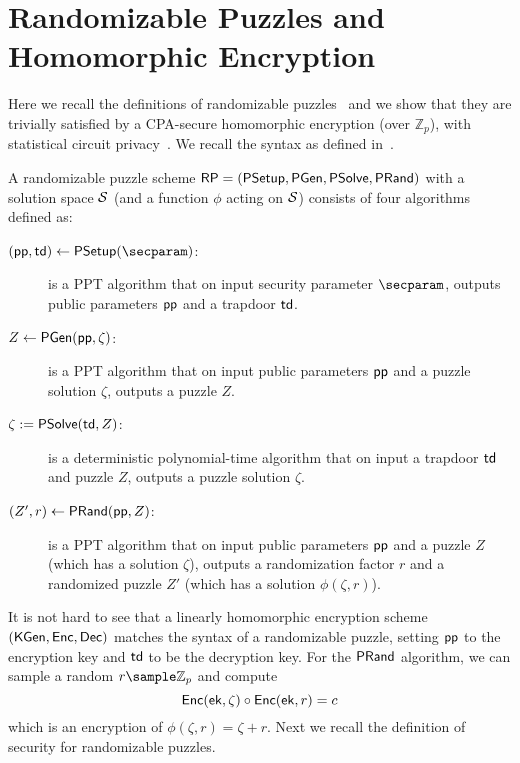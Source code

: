 \chapter{Randomizable Puzzles and Homomorphic Encryption}
\label{sec:randpuzzle}

Here we recall the definitions of randomizable puzzles~\cite{SP:TaiMorMaf21} and we show that they are trivially satisfied by a CPA-secure homomorphic encryption (over $\mathbb{Z}_p$), with statistical circuit privacy~\cite{C:OstPasPas14}. We recall the syntax as defined in~\cite{SP:TaiMorMaf21}.

\begin{definition}
A randomizable puzzle scheme $\mathsf{RP} = (\mathsf{PSetup}, \mathsf{PGen}, \mathsf{PSolve}, \mathsf{PRand})$ with a solution space $\mathcal{S}$ (and a function $\phi$ acting on $\mathcal{S}$) consists of four algorithms defined as:
\begin{description}
	\item[$(\pparam, \td) \gets \psetup(\secparam)$:] is a PPT algorithm that on input security parameter $\secparam$, outputs public parameters $\mathsf{pp}$ and a trapdoor $\mathsf{td}$.
	\item[$Z \gets \mathsf{PGen}(\mathsf{pp}, \zeta)$:] is a PPT algorithm that on input public parameters $\mathsf{pp}$ and a puzzle solution $\zeta$, outputs a puzzle $Z$.
	\item[$\zeta := \mathsf{PSolve}(\mathsf{td}, Z)$:] is a deterministic polynomial-time algorithm that on input a trapdoor $\mathsf{td}$ and puzzle $Z$, outputs a puzzle solution $\zeta$.
	\item[$(Z', r) \gets \mathsf{PRand}(\mathsf{pp}, Z)$:] is a PPT algorithm that on input public parameters $\mathsf{pp}$ and a puzzle $Z$ (which has a solution $\zeta$), outputs a randomization factor $r$ and a randomized puzzle $Z'$ (which has a solution $\phi(\zeta, r)$).
\end{description}
\end{definition}
It is not hard to see that a linearly homomorphic encryption scheme $({\mathsf{KGen}},\allowbreak {\mathsf{Enc}}, {\mathsf{Dec}})$ matches the syntax of a randomizable puzzle, setting $\mathsf{pp}$ to the encryption key and $\mathsf{td}$ to be the decryption key. For the $\mathsf{PRand}$ algorithm, we can sample a random $r \sample \mathbb{Z}_p$ and compute
$$
{\mathsf{Enc}}(\mathsf{ek}, \zeta) \circ {\mathsf{Enc}}(\mathsf{ek}, r) = c 
$$
which is an encryption of $\phi(\zeta, r) = \zeta + r$. Next we recall the definition of security for randomizable puzzles.
